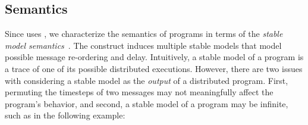 


%


\subsection{Semantics}
Since \lang uses , we characterize the semantics of \lang programs in terms of the {\em stable model semantics}~\cite{stable-model}.  The  construct induces multiple stable models that model possible message re-ordering and delay.  Intuitively, a stable model of a \lang program is a trace of one of its possible distributed executions.  However, there are two issues with considering a stable model as the {\em output} of a distributed program.  First, permuting the timesteps of two messages may not meaningfully affect the program's behavior, and second, a stable model of a \lang program may be infinite, such as in the following example:

